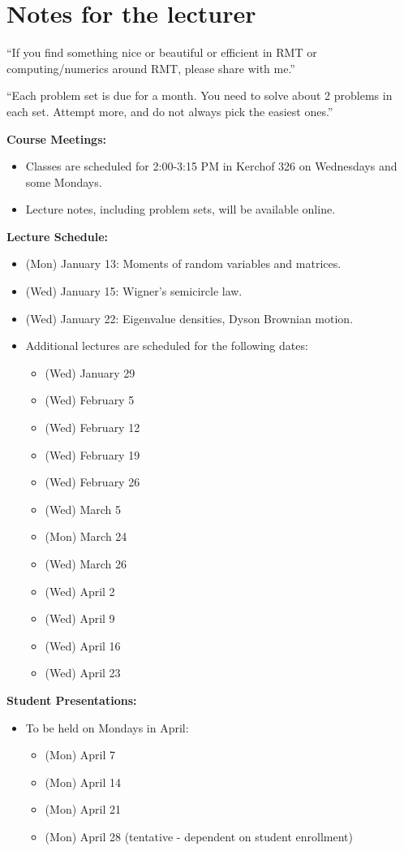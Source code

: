 \documentclass[letterpaper,11pt,oneside,reqno]{book}
\numberwithin{equation}{chapter}  %
\theoremstyle{definition}
\newenvironment{lnotes}{\section*{Notes for the lecturer}}{}
\begin{document}
\begin{lnotes}

``If you find something nice or beautiful or efficient in
RMT or computing/numerics around RMT, please share with me.''

\medskip

``Each problem set is due for a month.
You need to solve about 2 problems in each set. Attempt more,
and do not always pick the easiest ones.''

\medskip


\textbf{Course Meetings:}
\begin{itemize}
				\item Classes are scheduled for 2:00-3:15 PM in Kerchof 326 on Wednesdays and some Mondays.
				\item Lecture notes, including problem sets, will be available online.
\end{itemize}

\textbf{Lecture Schedule:}
\begin{itemize}
				\item (Mon) January 13: Moments of random variables and matrices.
				\item (Wed) January 15: Wigner's semicircle law.
				\item (Wed) January 22: Eigenvalue densities, Dyson Brownian motion.
				\item Additional lectures are scheduled for the following dates:
				\begin{itemize}
								\item (Wed) January 29
								\item (Wed) February 5
								\item (Wed) February 12
								\item (Wed) February 19
								\item (Wed) February 26
								\item (Wed) March 5
								\item (Mon) March 24
								\item (Wed) March 26
								\item (Wed) April 2
								\item (Wed) April 9
								\item (Wed) April 16
								\item (Wed) April 23
				\end{itemize}
\end{itemize}

\textbf{Student Presentations:}
\begin{itemize}
				\item To be held on Mondays in April:
				\begin{itemize}
								\item (Mon) April 7
								\item (Mon) April 14
								\item (Mon) April 21
								\item (Mon) April 28 (tentative - dependent on student enrollment)
				\end{itemize}
\end{itemize}


\end{lnotes}
\end{document}
